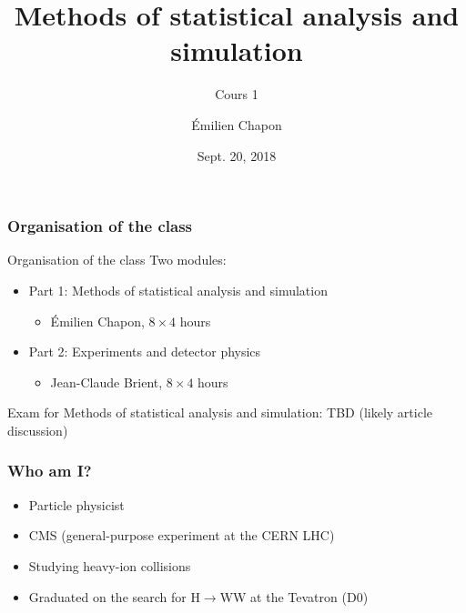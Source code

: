 \documentclass[9pt]{beamer}
\date[Stat1]{Sept. 20, 2018}
\title{Methods of statistical analysis and simulation}
\subtitle{Cours 1}
\author[E. Chapon]{Émilien Chapon}
\begin{document}
{

\begin{frame}
 \maketitle
 
\end{frame}
}

\begin{frame}
 \frametitle{Organisation of the class}
 
 \begin{block}{Organisation of the class}
  Two modules:
  
  \begin{itemize}
   \item Part 1: Methods of statistical analysis and simulation
   \begin{itemize}
    \item Émilien Chapon, $8\times 4$ hours
   \end{itemize}
   \item Part 2: Experiments and detector physics
   \begin{itemize}
    \item Jean-Claude Brient, $8\times 4$ hours
   \end{itemize}
  \end{itemize}

 \end{block}
 
 Exam for Methods of statistical analysis and simulation: TBD (likely article discussion)

\end{frame}

\begin{frame}
 \frametitle{Who am I?}
 
 \begin{itemize}
  \item Particle physicist
  \item CMS (general-purpose experiment at the CERN LHC)
  \item Studying heavy-ion collisions
  \item Graduated on the search for H$\to$WW at the Tevatron (D0)
 \end{itemize}

\end{frame}
\end{document}
